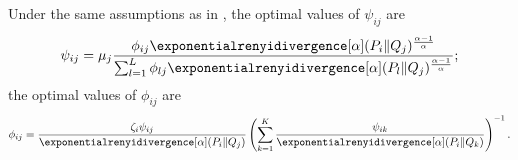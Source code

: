 \begin{prop}
    Under the same assumptions as in , the optimal values of $\psi_{ij}$ are
    \begin{align}
    \label{eq:psi_optim}
        \psi_{ij} = \mu_{j} \frac{\phi_{ij}\exponentialrenyidivergence[\alpha](P_i\Vert Q_j)^{\frac{\alpha-1}{\alpha}}}{\sum_{l=1}^L \phi_{lj}\exponentialrenyidivergence[\alpha](P_l\Vert Q_j)^{\frac{\alpha-1}{\alpha}}};
    \end{align}
    the optimal values of $\phi_{ij}$ are
    \begin{align}
    \label{eq:phi_optim}
        \phi_{ij} = \frac{\zeta_i \psi_{ij}}{ \exponentialrenyidivergence[\alpha](P_i\Vert Q_j)} \left(\sum_{k=1}^K\frac{\psi_{ik}}{\exponentialrenyidivergence[\alpha](P_i\Vert Q_k)}\right)^{-1}.
    \end{align}
\end{prop}
